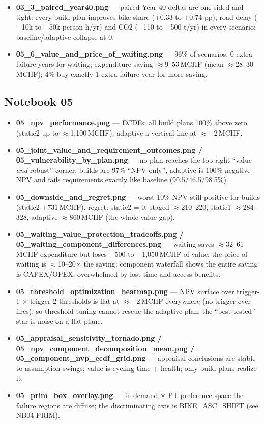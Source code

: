 \documentclass[10pt,a4paper]{article}
\begin{document}
\begin{itemize}
\item \textbf{03\_3\_paired\_year40.png} --- paired Year-40 deltas are one-sided and tight: every build plan improves bike share (+0.33 to +0.74 pp), road delay ($-$10k to $-$50k person-h/yr) and CO2 ($-$110 to $-$500 t/yr) in every scenario; baseline/adaptive collapse at 0.
\item \textbf{05\_6\_value\_and\_price\_of\_waiting.png} --- 96\% of scenarios: 0 extra failure years for waiting; expenditure saving $\approx$9--53\,MCHF (mean $\approx$28--30\,MCHF); 4\% buy exactly 1 extra failure year for more saving.
\end{itemize}

\subsection{Notebook 05}
\begin{itemize}
\item \textbf{05\_npv\_performance.png} --- ECDFs: all build plans 100\% above zero (static2 up to $\approx$1{,}100\,MCHF), adaptive a vertical line at $\approx-$2\,MCHF.
\item \textbf{05\_joint\_value\_and\_requirement\_outcomes.png / 05\_vulnerability\_by\_plan.png} --- no plan reaches the top-right ``value \emph{and} robust'' corner; builds are 97\% ``NPV only'', adaptive is 100\% negative-NPV and fails requirements exactly like baseline (90.5/46.5/98.5\%).
\item \textbf{05\_downside\_and\_regret.png} --- worst-10\% NPV still positive for builds (static2 +731\,MCHF), regret: static2 = 0, staged $\approx$210--220, static1 $\approx$284--328, adaptive $\approx$860\,MCHF (the whole value gap).
\item \textbf{05\_waiting\_value\_protection\_tradeoffs.png / 05\_waiting\_component\_differences.png} --- waiting saves $\approx$32--61\,MCHF expenditure but loses $-$500 to $-$1{,}050\,MCHF of value: the price of waiting is $\approx$10--20$\times$ the saving; component waterfall shows the entire saving is CAPEX/OPEX, overwhelmed by lost time-and-access benefits.
\item \textbf{05\_threshold\_optimization\_heatmap.png} --- NPV surface over trigger-1 $\times$ trigger-2 thresholds is flat at $\approx-$2\,MCHF everywhere (no trigger ever fires), so threshold tuning cannot rescue the adaptive plan; the ``best tested'' star is noise on a flat plane.
\item \textbf{05\_appraisal\_sensitivity\_tornado.png / 05\_npv\_component\_decomposition\_mean.png / 05\_component\_nvp\_ecdf\_grid.png} --- appraisal conclusions are stable to assumption swings; value is cycling time + health; only build plans realize it.
\item \textbf{05\_prim\_box\_overlay.png} --- in demand $\times$ PT-preference space the failure regions are diffuse; the discriminating axis is BIKE\_ASC\_SHIFT (see NB04 PRIM).
\end{itemize}
\end{document}
